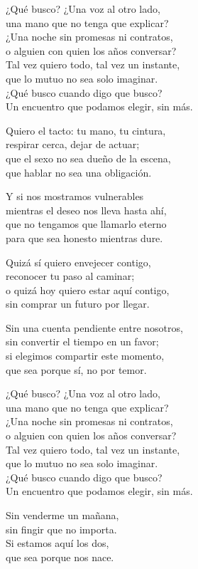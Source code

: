 \begin{lyrics}
¿Qué busco? ¿Una voz al otro lado,\\
una mano que no tenga que explicar?\\
¿Una noche sin promesas ni contratos,\\
o alguien con quien los años conversar?\\
Tal vez quiero todo, tal vez un instante,\\
que lo mutuo no sea solo imaginar.\\
¿Qué busco cuando digo que busco?\\
Un encuentro que podamos elegir, sin más.

Quiero el tacto: tu mano, tu cintura,\\
respirar cerca, dejar de actuar;\\
que el sexo no sea dueño de la escena,\\
que hablar no sea una obligación.

Y si nos mostramos vulnerables\\
mientras el deseo nos lleva hasta ahí,\\
que no tengamos que llamarlo eterno\\
para que sea honesto mientras dure.

Quizá sí quiero envejecer contigo,\\
reconocer tu paso al caminar;\\
o quizá hoy quiero estar aquí contigo,\\
sin comprar un futuro por llegar.

Sin una cuenta pendiente entre nosotros,\\
sin convertir el tiempo en un favor;\\
si elegimos compartir este momento,\\
que sea porque sí, no por temor.

¿Qué busco? ¿Una voz al otro lado,\\
una mano que no tenga que explicar?\\
¿Una noche sin promesas ni contratos,\\
o alguien con quien los años conversar?\\
Tal vez quiero todo, tal vez un instante,\\
que lo mutuo no sea solo imaginar.\\
¿Qué busco cuando digo que busco?\\
Un encuentro que podamos elegir, sin más.

Sin venderme un mañana,\\
sin fingir que no importa.\\
Si estamos aquí los dos,\\
que sea porque nos nace.
\end{lyrics}

